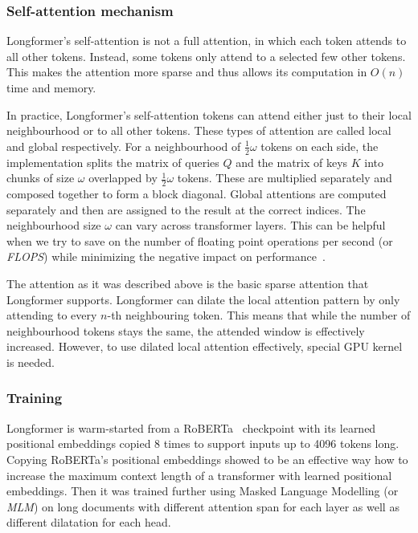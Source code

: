 \subsubsection{Self-attention mechanism}

Longformer's self-attention is not a full attention, in which each token attends
to all other tokens. Instead, some tokens only attend to a selected few other
tokens. This makes the attention more sparse and thus allows its computation in
$O(n)$ time and memory.

In practice, Longformer's self-attention tokens can attend either just to their
local neighbourhood or to all other tokens. These types of attention are called
local and global respectively. For a neighbourhood of $\frac{1}{2}\omega$
tokens on each side, the implementation splits the matrix of queries $Q$ and
the matrix of keys $K$ into chunks of size $\omega$ overlapped by
$\frac{1}{2}\omega$ tokens. These are multiplied separately and composed
together to form a block diagonal. Global attentions are computed separately
and then are assigned to the result at the correct indices. The neighbourhood
size $\omega$ can vary across transformer layers. This can be helpful when we
try to save on the number of floating point operations per second (or
\emph{FLOPS}) while minimizing the negative impact on
performance~\cite{sukhbaatar2019adaptive}.

The attention as it was described above is the basic sparse attention that
Longformer supports. Longformer can dilate the local attention pattern by only
attending to every $n$-th neighbouring token. This means that while the number
of neighbourhood tokens stays the same, the attended window is effectively
increased. However, to use dilated local attention effectively, special GPU
kernel is needed.


\subsubsection{Training}

Longformer is warm-started from a RoBERTa~\cite{liu2019roberta} checkpoint with
its learned positional embeddings copied 8 times to support inputs up to 4096
tokens long. Copying RoBERTa's positional embeddings showed to be an effective
way how to increase the maximum context length of a transformer with learned
positional embeddings. Then it was trained further using Masked Language
Modelling (or \emph{MLM}) on long documents with different attention span for
each layer as well as different dilatation for each head.

